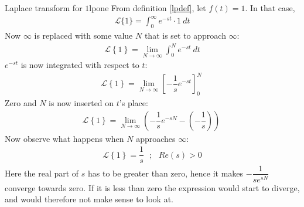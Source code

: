 \begin{example}{Laplace transform for $1$}{lpone}
From definition \ref{lpdef}, let $f(t)=1$. In that case,
\begin{align*}
\mathcal{L}\{1\}=\int_{0}^{\infty} e^{-st} \cdot 1\ dt
\end{align*}
Now $\infty$ is replaced with some value $N$ that is set to approach $\infty$:
\begin{align*}
\mathcal{L} \left\{1 \right\}= \lim_{N \to \infty}  \int_{0}^{N} e^{-st}\ dt
\end{align*}
$e^{-st}$ is now integrated with respect to $t$:
\begin{align*}
\mathcal{L} \left\{1 \right\}= \lim_{N \to \infty} \left[ -\dfrac{1}{s} e^{-st} \right]_{0}^{N} \ 
\end{align*}
Zero and $N$ is now inserted on $t$’s place:
\begin{align*}
\mathcal{L} \left\{1 \right\}= \lim_{N \to \infty} \left( -\dfrac{1}{s} e^{-sN} - \left(-\dfrac{1}{s}\right) \right) \ 
\end{align*}
Now observe what happens when $N$ approaches $\infty$:
\begin{align*}
\mathcal{L} \left\{1 \right\}=\dfrac{1}{s} \ \ \ ; \ \ \ Re(s) > 0
\end{align*}
Here the real part of $s$ has to be greater than zero, hence it makes $-\dfrac{1}{se^{sN}}$ converge towards zero. If it is less than zero the expression would start to diverge, and would therefore not make sense to look at.
\end{example}

